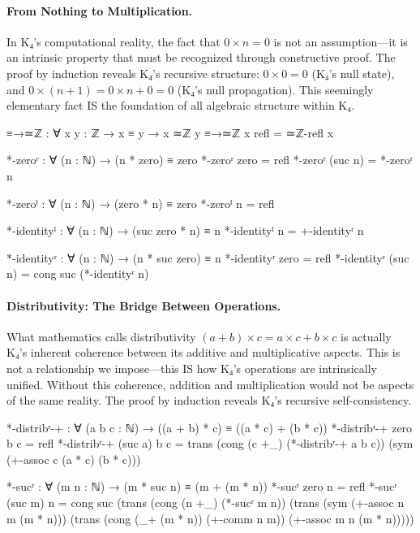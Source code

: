 \documentclass[11pt,a4paper]{book}
\begin{document}
\paragraph{From Nothing to Multiplication.}
In K₄'s computational reality, the fact that $0 \times n = 0$ is not an assumption—it is an intrinsic property that must be recognized through constructive proof. The proof by induction reveals K₄'s recursive structure: $0 \times 0 = 0$ (K₄'s null state), and $0 \times (n+1) = 0 \times n + 0 = 0$ (K₄'s null propagation). This seemingly elementary fact IS the foundation of all algebraic structure within K₄.

\begin{code}
≡→≃ℤ : ∀ {x y : ℤ} → x ≡ y → x ≃ℤ y
≡→≃ℤ {x} refl = ≃ℤ-refl x

*-zeroʳ : ∀ (n : ℕ) → (n * zero) ≡ zero
*-zeroʳ zero    = refl
*-zeroʳ (suc n) = *-zeroʳ n

*-zeroˡ : ∀ (n : ℕ) → (zero * n) ≡ zero
*-zeroˡ n = refl

*-identityˡ : ∀ (n : ℕ) → (suc zero * n) ≡ n
*-identityˡ n = +-identityʳ n

*-identityʳ : ∀ (n : ℕ) → (n * suc zero) ≡ n
*-identityʳ zero = refl
*-identityʳ (suc n) = cong suc (*-identityʳ n)
\end{code}

\paragraph{Distributivity: The Bridge Between Operations.}
What mathematics calls distributivity $(a + b) \times c = a \times c + b \times c$ is actually K₄'s inherent coherence between its additive and multiplicative aspects. This is not a relationship we impose—this IS how K₄'s operations are intrinsically unified. Without this coherence, addition and multiplication would not be aspects of the same reality. The proof by induction reveals K₄'s recursive self-consistency.

\begin{code}
*-distribʳ-+ : ∀ (a b c : ℕ) → ((a + b) * c) ≡ ((a * c) + (b * c))
*-distribʳ-+ zero    b c = refl
*-distribʳ-+ (suc a) b c = 
  trans (cong (c +_) (*-distribʳ-+ a b c)) 
        (sym (+-assoc c (a * c) (b * c)))

*-sucʳ : ∀ (m n : ℕ) → (m * suc n) ≡ (m + (m * n))
*-sucʳ zero    n = refl
*-sucʳ (suc m) n = cong suc (trans (cong (n +_) (*-sucʳ m n))
                     (trans (sym (+-assoc n m (m * n)))
                     (trans (cong (_+ (m * n)) (+-comm n m))
                     (+-assoc m n (m * n)))))
\end{code}
\end{document}
